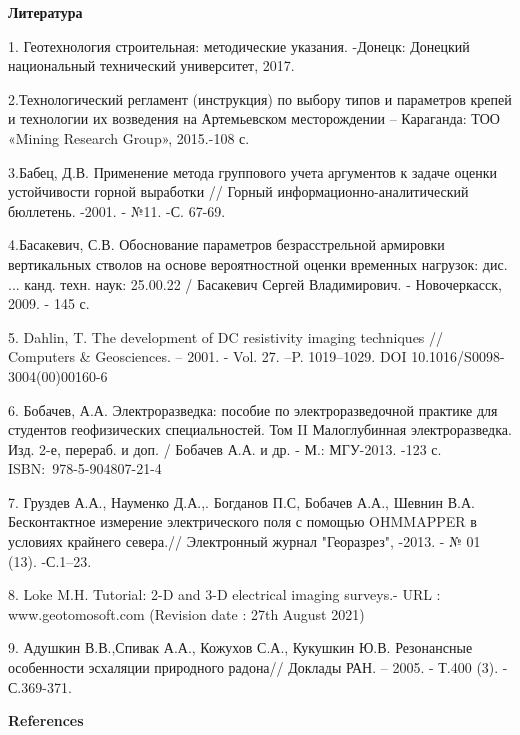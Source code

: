 \begin{center}
{\bfseries Литература}
\end{center}

\begin{noparindent}
1. Геотехнология строительная: методические указания. -Донецк: Донецкий
национальный технический университет, 2017.

2.Технологический регламент (инструкция) по выбору типов и параметров
крепей и технологии их возведения на Артемьевском месторождении --
Караганда: ТОО «Mining Research Group», 2015.-108 с.

3.Бабец, Д.В. Применение метода группового учета аргументов к задаче
оценки устойчивости горной выработки // Горный
информационно-аналитический бюллетень. -2001. - №11. -С. 67-69.

4.Басакевич, С.В. Обоснование параметров безрасстрельной армировки
вертикальных стволов на основе вероятностной оценки временных нагрузок:
дис. ... канд. техн. наук: 25.00.22 / Басакевич Сергей Владимирович. -
Новочеркасск, 2009. - 145 с.

5. Dahlin, T. The development of DC resistivity imaging techniques //
Computers \& Geosciences. -- 2001. - Vol. 27. --P. 1019--1029. DOI
10.1016/S0098-3004(00)00160-6

6. Бобачев, А.А. Электроразведка: пособие по электроразведочной практике
для студентов геофизических специальностей. Том II Малоглубинная
электроразведка. Изд. 2-е, перераб. и доп. / Бобачев А.А. и др. - М.:
МГУ-2013. -123 с. ISBN:~978-5-904807-21-4

7. Груздев А.А., Науменко Д.А.,. Богданов П.С, Бобачев А.А., Шевнин В.А.
Бесконтактное измерение электрического поля с помощью OHMMAPPER в
условиях крайнего севера.// Электронный журнал "Георазрез", -2013. - №
01 (13). -С.1--23.

8. Loke M.H. Tutorial: 2-D and 3-D electrical imaging surveys.- URL :
www.geotomosoft.com (Revision date : 27th August 2021)

9. Адушкин В.В.,Спивак А.А., Кожухов С.А., Кукушкин Ю.В. Резонансные
особенности эсхаляции природного радона// Доклады РАН. -- 2005. - Т.400
(3). - С.369-371.
\end{noparindent}

\begin{center}
{\bfseries References}
\end{center}

